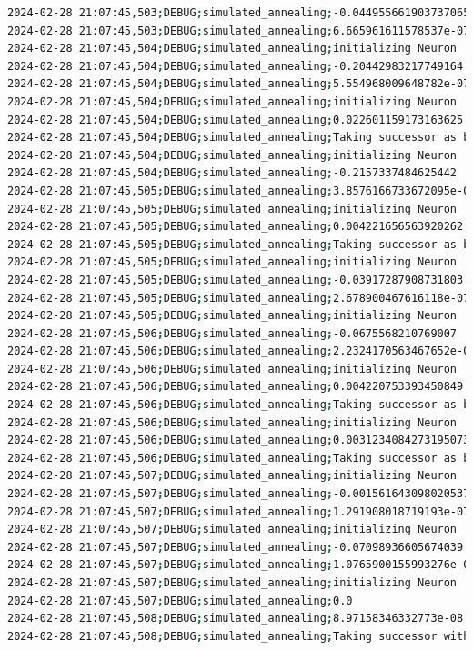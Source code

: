 \documentclass{article}
\begin{document}
\begin{lstlisting}[language=bash, caption=Example Output of Program]
2024-02-28 21:07:45,503;DEBUG;simulated_annealing;-0.044955661903737065
2024-02-28 21:07:45,503;DEBUG;simulated_annealing;6.665961611578537e-07
2024-02-28 21:07:45,504;DEBUG;simulated_annealing;initializing Neuron
2024-02-28 21:07:45,504;DEBUG;simulated_annealing;-0.20442983217749164
2024-02-28 21:07:45,504;DEBUG;simulated_annealing;5.554968009648782e-07
2024-02-28 21:07:45,504;DEBUG;simulated_annealing;initializing Neuron
2024-02-28 21:07:45,504;DEBUG;simulated_annealing;0.022601159173163625
2024-02-28 21:07:45,504;DEBUG;simulated_annealing;Taking successor as better option (exploitation)
2024-02-28 21:07:45,504;DEBUG;simulated_annealing;initializing Neuron
2024-02-28 21:07:45,504;DEBUG;simulated_annealing;-0.2157337484625442
2024-02-28 21:07:45,505;DEBUG;simulated_annealing;3.8576166733672095e-07
2024-02-28 21:07:45,505;DEBUG;simulated_annealing;initializing Neuron
2024-02-28 21:07:45,505;DEBUG;simulated_annealing;0.004221656563920262
2024-02-28 21:07:45,505;DEBUG;simulated_annealing;Taking successor as better option (exploitation)
2024-02-28 21:07:45,505;DEBUG;simulated_annealing;initializing Neuron
2024-02-28 21:07:45,505;DEBUG;simulated_annealing;-0.03917287908731803
2024-02-28 21:07:45,505;DEBUG;simulated_annealing;2.678900467616118e-07
2024-02-28 21:07:45,505;DEBUG;simulated_annealing;initializing Neuron
2024-02-28 21:07:45,506;DEBUG;simulated_annealing;-0.0675568210769007
2024-02-28 21:07:45,506;DEBUG;simulated_annealing;2.2324170563467652e-07
2024-02-28 21:07:45,506;DEBUG;simulated_annealing;initializing Neuron
2024-02-28 21:07:45,506;DEBUG;simulated_annealing;0.004220753393450849
2024-02-28 21:07:45,506;DEBUG;simulated_annealing;Taking successor as better option (exploitation)
2024-02-28 21:07:45,506;DEBUG;simulated_annealing;initializing Neuron
2024-02-28 21:07:45,506;DEBUG;simulated_annealing;0.0031234084273195073
2024-02-28 21:07:45,506;DEBUG;simulated_annealing;Taking successor as better option (exploitation)
2024-02-28 21:07:45,507;DEBUG;simulated_annealing;initializing Neuron
2024-02-28 21:07:45,507;DEBUG;simulated_annealing;-0.0015616430980205376
2024-02-28 21:07:45,507;DEBUG;simulated_annealing;1.291908018719193e-07
2024-02-28 21:07:45,507;DEBUG;simulated_annealing;initializing Neuron
2024-02-28 21:07:45,507;DEBUG;simulated_annealing;-0.07098936605674039
2024-02-28 21:07:45,507;DEBUG;simulated_annealing;1.0765900155993276e-07
2024-02-28 21:07:45,507;DEBUG;simulated_annealing;initializing Neuron
2024-02-28 21:07:45,507;DEBUG;simulated_annealing;0.0
2024-02-28 21:07:45,508;DEBUG;simulated_annealing;8.97158346332773e-08
2024-02-28 21:07:45,508;DEBUG;simulated_annealing;Taking successor with probability 100% (exploration)

\end{lstlisting}
\end{document}

